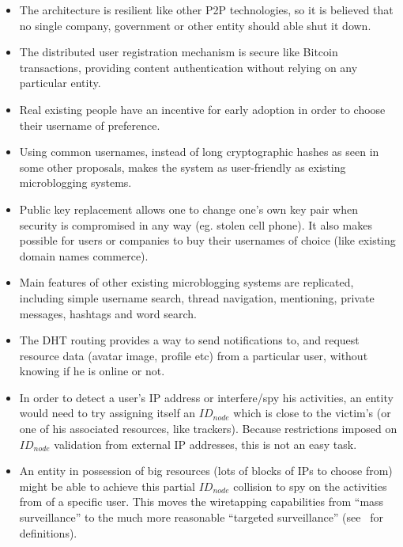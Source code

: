 \documentclass[a4paper,10pt]{article}
\begin{document}
\begin{itemize}
 \item The architecture is resilient like other P2P technologies, so it is believed that no single company, government or other entity should able shut it down.

 \item The distributed user registration mechanism is secure like Bitcoin transactions, providing content authentication without relying on any particular entity.

 \item Real existing people have an incentive for early adoption in order to choose their username of preference.

 \item Using common usernames, instead of long cryptographic hashes as seen in some other proposals, makes the system as user-friendly as existing microblogging systems.

 \item Public key replacement allows one to change one's own key pair when security is compromised in any way (eg. stolen cell phone). It also makes possible for users or companies to buy their usernames of choice (like existing domain names commerce).

 \item Main features of other existing microblogging systems are replicated, including simple username search, thread navigation, mentioning, private messages, hashtags and word search.

 \item The DHT routing provides a way to send notifications to, and request resource data (avatar image, profile etc) from a particular user, without knowing if he is online or not.

 \item In order to detect a user's IP address or interfere/spy his activities, an entity would need to try assigning itself an $ID_{node}$ which is close to the victim's (or one of his associated resources, like trackers). Because restrictions imposed on $ID_{node}$ validation from external IP addresses, this is not an easy task. 

 \item An entity in possession of big resources (lots of blocks of IPs to choose from) might be able to achieve this partial $ID_{node}$ collision to spy on the activities from of a specific user. This moves the wiretapping capabilities from ``mass surveillance'' to the much more reasonable ``targeted surveillance'' (see~\cite{surveillance} for definitions).


\end{itemize}
\end{document}
